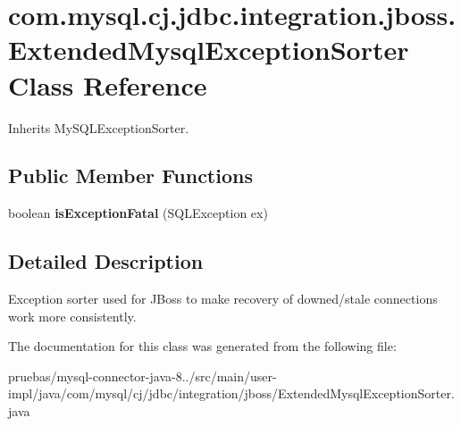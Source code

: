 \hypertarget{classcom_1_1mysql_1_1cj_1_1jdbc_1_1integration_1_1jboss_1_1_extended_mysql_exception_sorter}{}\section{com.\+mysql.\+cj.\+jdbc.\+integration.\+jboss.\+Extended\+Mysql\+Exception\+Sorter Class Reference}
\label{classcom_1_1mysql_1_1cj_1_1jdbc_1_1integration_1_1jboss_1_1_extended_mysql_exception_sorter}


Inherits My\+S\+Q\+L\+Exception\+Sorter.

\subsection*{Public Member Functions}
\begin{DoxyCompactItemize}
\item 
\mbox{\label{classcom_1_1mysql_1_1cj_1_1jdbc_1_1integration_1_1jboss_1_1_extended_mysql_exception_sorter_a9cfe7633f1e57c781cf615f90b552537}} 
boolean {\bfseries is\+Exception\+Fatal} (S\+Q\+L\+Exception ex)
\end{DoxyCompactItemize}


\subsection{Detailed Description}
Exception sorter used for J\+Boss to make recovery of downed/stale connections work more consistently. 

The documentation for this class was generated from the following file\+:\begin{DoxyCompactItemize}
\item 
pruebas/mysql-\/connector-\/java-\/8../src/main/user-\/impl/java/com/mysql/cj/jdbc/integration/jboss/Extended\+Mysql\+Exception\+Sorter.\+java\end{DoxyCompactItemize}
